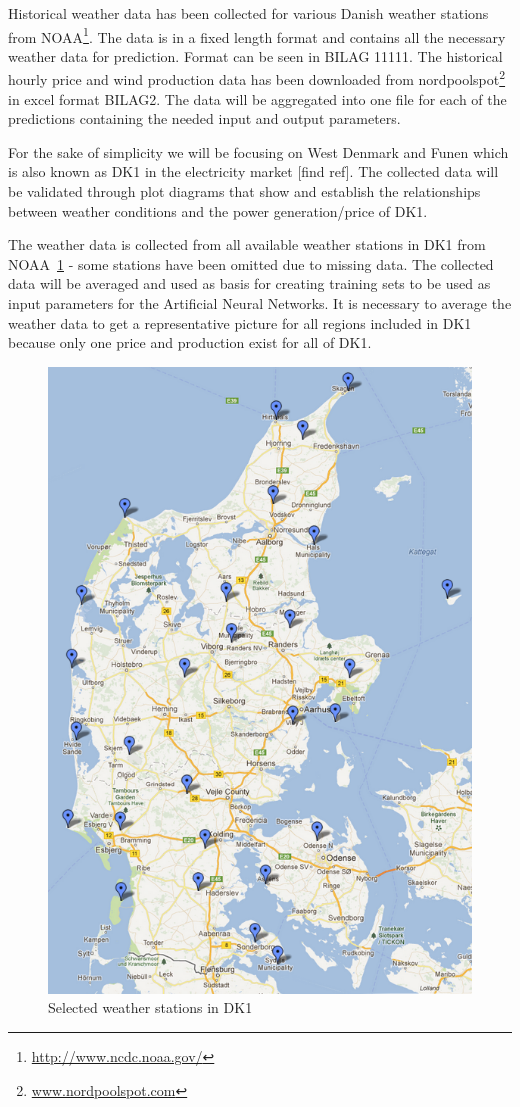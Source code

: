 Historical weather data has been collected for various Danish weather stations from NOAA\footnote{\url{http://www.ncdc.noaa.gov/}}. The data is in a fixed length format and contains all the necessary weather data for prediction. Format can be seen in BILAG 11111. 
The historical hourly price and wind production data has been downloaded from nordpoolspot\footnote{\url{www.nordpoolspot.com}} in excel format BILAG2.
The data will be aggregated into one file for each of the predictions containing the needed input and output parameters.

For the sake of simplicity we will be focusing on West Denmark and Funen which is also known as DK1 in the electricity market [find ref]. The collected data will be validated through plot diagrams that show and establish the relationships between weather conditions and the power generation/price of DK1.

The weather data is collected from all available weather stations in DK1 from NOAA~\ref{fig:stations4average} - some stations have been omitted due to missing data. The collected data will be averaged and used as basis for creating training sets to be used as input parameters for the Artificial Neural Networks. It is necessary to average the weather data to get a representative picture for all regions included in DK1 because only one price and production exist for all of DK1.

\begin{figure}[H]
\centering
\includegraphics[width=0.85\linewidth,natwidth=898,natheight=587]{billeder/stations4average.png}
\caption{Selected weather stations in DK1}
\label{fig:stations4average}
\end{figure}


